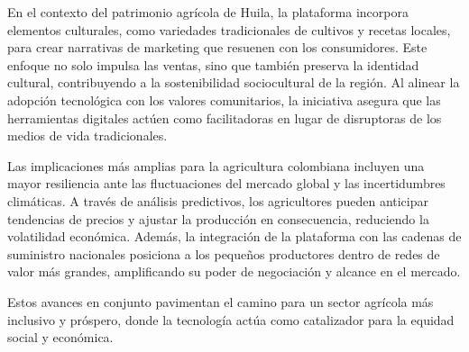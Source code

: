 En el contexto del patrimonio agrícola de Huila, la plataforma incorpora elementos culturales, como variedades tradicionales de cultivos y recetas locales, para crear narrativas de marketing que resuenen con los consumidores. Este enfoque no solo impulsa las ventas, sino que también preserva la identidad cultural, contribuyendo a la sostenibilidad sociocultural de la región. Al alinear la adopción tecnológica con los valores comunitarios, la iniciativa asegura que las herramientas digitales actúen como facilitadoras en lugar de disruptoras de los medios de vida tradicionales.

Las implicaciones más amplias para la agricultura colombiana incluyen una mayor resiliencia ante las fluctuaciones del mercado global y las incertidumbres climáticas. A través de análisis predictivos, los agricultores pueden anticipar tendencias de precios y ajustar la producción en consecuencia, reduciendo la volatilidad económica. Además, la integración de la plataforma con las cadenas de suministro nacionales posiciona a los pequeños productores dentro de redes de valor más grandes, amplificando su poder de negociación y alcance en el mercado.

Estos avances en conjunto pavimentan el camino para un sector agrícola más inclusivo y próspero, donde la tecnología actúa como catalizador para la equidad social y económica.
